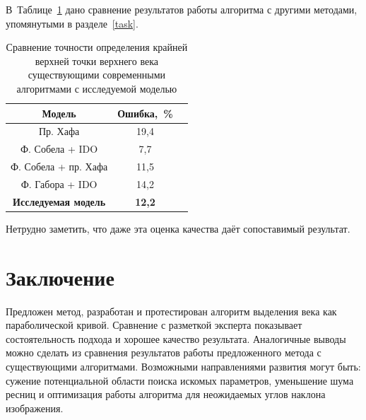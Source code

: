 \documentclass[12pt,a4paper]{article} %
\begin{document}
В~Таблице~\ref{Tab:1} дано сравнение результатов работы алгоритма с другими методами, упомянутыми в разделе~\ref{task}.

\begin{table}[h]
	\centering
	\begin{tabular}{ccc}
		\hline Модель & Ошибка,~\%  &   \\
		\hline Пр. Хафа \cite{Wildes} & 19,4 &  \\
		Ф. Собела + IDO \cite{KP} & 7,7 &   \\
		Ф. Собела + пр. Хафа \cite{Adam_1} & 11,5 &  \\
		Ф. Габора + IDO \cite{KKX} & 14,2 &   \\
		\hline
		\textbf{Исследуемая модель}&   \textbf{12,2}&     \\
		\hline 
	\end{tabular}

	\caption{Сравнение точности определения крайней верхней точки верхнего века существующими современными алгоритмами с исследуемой моделью}
	\label{Tab:1}
\end{table}

Нетрудно заметить, что даже эта оценка качества даёт сопоставимый результат.


\newpage
\section{Заключение}

Предложен метод, разработан и протестирован алгоритм выделения века как параболической кривой. Сравнение с разметкой эксперта показывает состоятельность подхода и хорошее качество результата. Аналогичные выводы можно сделать из сравнения результатов работы предложенного метода с существующими алгоритмами. Возможными направлениями развития могут быть: сужение потенциальной области поиска искомых параметров, уменьшение шума ресниц и оптимизация работы алгоритма для неожидаемых углов наклона изображения.



\newpage



\nocite{GV}
\end{document}
